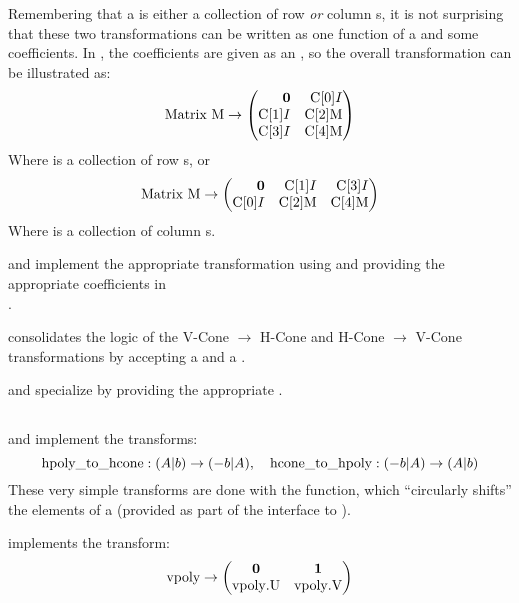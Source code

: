 Remembering that a  is either a collection of row \textit{or} column s, it is not surprising that these two transformations can be written as one function of a  and some coefficients.  In , the coefficients are given as an , so the overall transformation can be illustrated as:
\newcommand{\CA}[1]{\mli{C[#1]}}
\[ \mli{Matrix M} \to 
    \begin{pmatrix*}[r] 
      \0 & \CA{0}I \\ 
      \CA{1}I & \CA{2}\mli{M} \\ 
      \CA{3}I & \CA{4}\mli{M} 
    \end{pmatrix*} \]
Where  is a collection of row s, or
\[ \mli{Matrix M} \to 
  \begin{pmatrix*}[r] 
    \0 & \CA{1}I & \CA{3}I \\ 
    \CA{0}I & \CA{2}\mli{M} & \CA{4}\mli{M} 
  \end{pmatrix*} \]
Where  is a collection of column s.
\lstgeneralizedlift

 and  implement the appropriate transformation using  and providing the appropriate coefficients in \\
.
\lstliftvcone
\lstlifthcone

 consolidates the logic of the V-Cone $\to$ H-Cone and H-Cone $\to$ V-Cone transformations by accepting a  and a .
\lstconetransform

 and  specialize  by providing the appropriate .
\lstvconetohcone
\lsthconetovcone

\subsection{}

 and  implement the  transforms:
\[ \mli{hpoly_to_hcone}: (A|b) \to (-b|A),\quad \mli{hcone_to_hpoly} : (-b|A) \to (A|b) \]
These very simple transforms are done with the  function, which ``circularly shifts'' the elements of a  (provided as part of the interface to ).
\lsthpolytohcone
\lsthconetohpoly

 implements the  transform:
\[ \mli{vpoly} \to 
    \begin{pmatrix} 
      \0 & \vec{1} \\ \mli{vpoly.U} & \mli{vpoly.V} 
    \end{pmatrix} \]
\lstvpolytovcone

